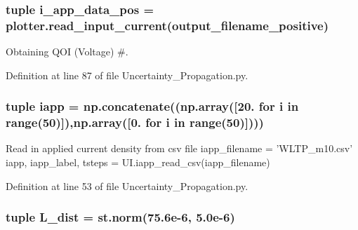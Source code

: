 \hypertarget{namespace_uncertainty___propagation_aa34db849c2abe725ec1b080fb93b0249}{
\subsubsection[{i\-\_\-app\-\_\-data\-\_\-pos}]{\setlength{\rightskip}{0pt plus 5cm}tuple i\-\_\-app\-\_\-data\-\_\-pos = {\bf plotter.\-read\-\_\-input\-\_\-current}(output\-\_\-filename\-\_\-positive)}}\label{namespace_uncertainty___propagation_aa34db849c2abe725ec1b080fb93b0249}


Obtaining Q\-O\-I (Voltage) \#. 



Definition at line 87 of file Uncertainty\-\_\-\-Propagation.\-py.

\hypertarget{namespace_uncertainty___propagation_a32f0308fa61c28532eb593947e7b3fe0}{
\subsubsection[{iapp}]{\setlength{\rightskip}{0pt plus 5cm}tuple iapp = np.\-concatenate((np.\-array(\mbox{[}20. for i in range(50)\mbox{]}),np.\-array(\mbox{[}0. for i in range(50)\mbox{]})))}}\label{namespace_uncertainty___propagation_a32f0308fa61c28532eb593947e7b3fe0}


Read in applied current density from csv file iapp\-\_\-filename = 'W\-L\-T\-P\-\_\-m10.\-csv' iapp, iapp\-\_\-label, tsteps = U\-I.\-iapp\-\_\-read\-\_\-csv(iapp\-\_\-filename) 



Definition at line 53 of file Uncertainty\-\_\-\-Propagation.\-py.

\hypertarget{namespace_uncertainty___propagation_a9dd2d48c13873f64c963b96328631c78}{
\subsubsection[{L\-\_\-dist}]{\setlength{\rightskip}{0pt plus 5cm}tuple L\-\_\-dist = st.\-norm(75.\-6e-\/6, 5.\-0e-\/6)}}\label{namespace_uncertainty___propagation_a9dd2d48c13873f64c963b96328631c78}


